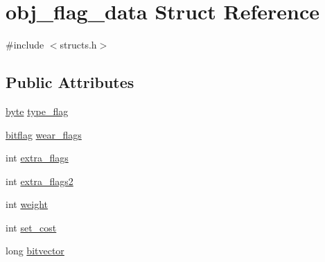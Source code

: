 \hypertarget{structobj__flag__data}{\section{obj\-\_\-flag\-\_\-data Struct Reference}
\label{structobj__flag__data}
}


{\ttfamily \#include $<$structs.\-h$>$}

\subsection*{Public Attributes}
\begin{DoxyCompactItemize}
\item 
\hyperlink{structs_8h_a2b7e7856b48ec3327148ac994ad95cd5}{byte} \hyperlink{structobj__flag__data_a9a0abc63896f4f00368603321ecb4e60}{type\-\_\-flag}
\item 
\hyperlink{structs_8h_af5b34f10bae6d3b8f168d5eb6fab2925}{bitflag} \hyperlink{structobj__flag__data_a23018dd0bbb80c771ca335cba31d968c}{wear\-\_\-flags}
\item 
int \hyperlink{structobj__flag__data_a68873d06d59dc879eb51d8e735963b9f}{extra\-\_\-flags}
\item 
int \hyperlink{structobj__flag__data_a0bd18c08b6c3b1371634959e77e2f845}{extra\-\_\-flags2}
\item 
int \hyperlink{structobj__flag__data_a066008057439b4c23919acea5c646741}{weight}
\item 
int \hyperlink{structobj__flag__data_a094eee4c675f5a6b1959fd1f3ea48613}{set\-\_\-cost}
\item 
long \hyperlink{structobj__flag__data_a9fc43403ff7a9e0ab701937e64e42263}{bitvector}
\end{DoxyCompactItemize}


